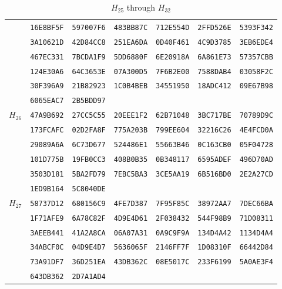 \begin{table}\centering\caption{$H_{25}$ through $H_{32}$}
\begin{tabular}{@{}ccccccc@{}}\toprule\label{table:H32_4}
\multirow{6}{*}{$H_{25}$}
 & \texttt{16E8BF5F} & \texttt{597007F6} & \texttt{483BB87C} & \texttt{712E554D} & \texttt{2FFD526E} & \texttt{5393F342}\\
 & \texttt{3A10621D} & \texttt{42D84CC8} & \texttt{251EA6DA} & \texttt{0D40F461} & \texttt{4C9D3785} & \texttt{3EB6EDE4}\\
 & \texttt{467EC331} & \texttt{7BCDA1F9} & \texttt{5DD6880F} & \texttt{6E20918A} & \texttt{6A861E73} & \texttt{57357CBB}\\
 & \texttt{124E30A6} & \texttt{64C3653E} & \texttt{07A300D5} & \texttt{7F6B2E00} & \texttt{7588DAB4} & \texttt{03058F2C}\\
 & \texttt{30F396A9} & \texttt{21B82923} & \texttt{1C0B4BEB} & \texttt{34551950} & \texttt{18ADC412} & \texttt{09E67B98}\\
 & \texttt{6065EAC7} & \texttt{2B5BDD97}\\

\midrule
\multirow{6}{*}{$H_{26}$}
 & \texttt{47A9B692} & \texttt{27CC5C55} & \texttt{20EEE1F2} & \texttt{62B71048} & \texttt{3BC717BE} & \texttt{70789D9C}\\
 & \texttt{173FCAFC} & \texttt{02D2FA8F} & \texttt{775A203B} & \texttt{799EE604} & \texttt{32216C26} & \texttt{4E4FCD0A}\\
 & \texttt{29089A6A} & \texttt{6C73D677} & \texttt{524486E1} & \texttt{55663B46} & \texttt{0C163CB0} & \texttt{05F04728}\\
 & \texttt{101D775B} & \texttt{19FB0CC3} & \texttt{408B0B35} & \texttt{0B348117} & \texttt{6595ADEF} & \texttt{496D70AD}\\
 & \texttt{3503D181} & \texttt{5BA2FD79} & \texttt{7EBC5BA3} & \texttt{3CE5AA19} & \texttt{6B516BD0} & \texttt{2E2A27CD}\\
 & \texttt{1ED9B164} & \texttt{5C8040DE}\\

\midrule
\multirow{6}{*}{$H_{27}$}
 & \texttt{58737D12} & \texttt{680156C9} & \texttt{4FE7D387} & \texttt{7F95F85C} & \texttt{38972AA7} & \texttt{7DEC66BA}\\
 & \texttt{1F71AFE9} & \texttt{6A78C82F} & \texttt{4D9E4D61} & \texttt{2F038432} & \texttt{544F98B9} & \texttt{71D08311}\\
 & \texttt{3AEEB441} & \texttt{41A2A8CA} & \texttt{06A07A31} & \texttt{0A9C9F9A} & \texttt{134D4A42} & \texttt{1134D4A4}\\
 & \texttt{34ABCF0C} & \texttt{04D9E4D7} & \texttt{5636065F} & \texttt{2146FF7F} & \texttt{1D08310F} & \texttt{66442D84}\\
 & \texttt{73A91DF7} & \texttt{36D251EA} & \texttt{43DB362C} & \texttt{08E5017C} & \texttt{233F6199} & \texttt{5A0AE3F4}\\
 & \texttt{643DB362} & \texttt{2D7A1AD4}\\


\end{tabular}
\end{table}
